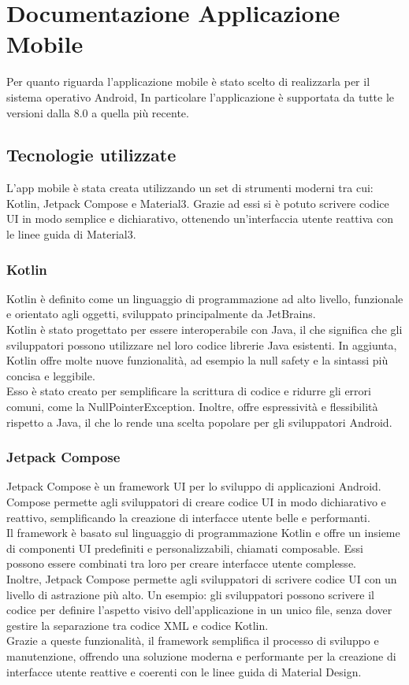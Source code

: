 \documentclass[a4paper,final,12pt]{report}
\begin{document}
\chapter{Documentazione Applicazione Mobile}
Per quanto riguarda l'applicazione mobile è stato scelto di realizzarla per il sistema operativo Android, In particolare l'applicazione è supportata da tutte le versioni dalla 8.0 a quella più recente.

\section{Tecnologie utilizzate}
 L'app mobile è stata creata utilizzando un set di strumenti moderni tra cui: Kotlin, Jetpack Compose e Material3. Grazie ad essi si è potuto scrivere codice UI in modo semplice e dichiarativo, ottenendo un'interfaccia utente reattiva con le linee guida di Material3.

 \subsection{Kotlin}
 Kotlin è definito come un linguaggio di programmazione ad alto livello, funzionale e orientato agli oggetti, sviluppato principalmente da JetBrains.\\

Kotlin è stato progettato per essere interoperabile con Java, il che significa che gli sviluppatori possono utilizzare nel loro codice librerie Java esistenti. In aggiunta, Kotlin offre molte nuove funzionalità, ad esempio la null safety e la sintassi più concisa e leggibile.\\

Esso è stato creato per semplificare la scrittura di codice e ridurre gli errori comuni, come la NullPointerException. Inoltre, offre espressività e flessibilità rispetto a Java, il che lo rende una scelta popolare per gli sviluppatori Android.

 \subsection{Jetpack Compose}
 Jetpack Compose è un framework UI per lo sviluppo di applicazioni Android. Compose permette agli sviluppatori di creare codice UI in modo dichiarativo e reattivo, semplificando la creazione di interfacce utente belle e performanti.\\
Il framework è basato sul linguaggio di programmazione Kotlin e offre un insieme di componenti UI predefiniti e personalizzabili, chiamati composable. Essi possono essere combinati tra loro per creare interfacce utente complesse.\\
Inoltre, Jetpack Compose permette agli sviluppatori di scrivere codice UI con un livello di astrazione più alto. Un esempio: gli sviluppatori possono scrivere il codice per definire l'aspetto visivo dell'applicazione in un unico file, senza dover gestire la separazione tra codice XML e codice Kotlin.\\
Grazie a queste funzionalità, il framework semplifica il processo di sviluppo e manutenzione, offrendo una soluzione moderna e performante per la creazione di interfacce utente reattive e coerenti con le linee guida di Material Design.
\end{document}
